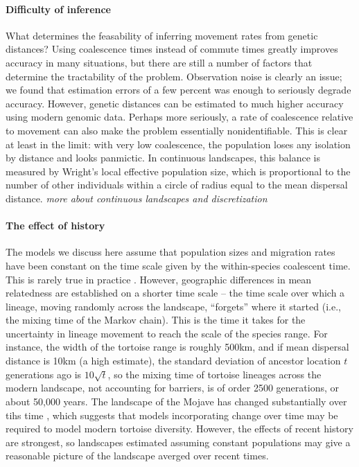 \documentclass{article}
\newcommand{\plr}[1]{{\em \color{blue} #1}}
\begin{document}
\paragraph{Difficulty of inference}
What determines the feasability of inferring movement rates from genetic distances?
Using coalescence times instead of commute times greatly improves accuracy in many situations,
but there are still a number of factors that determine the tractability of the problem.
Observation noise is clearly an issue;
we found that estimation errors of a few percent was enough to seriously degrade accuracy.
However, genetic distances can be estimated to much higher accuracy using modern genomic data.
Perhaps more seriously,
a rate of coalescence relative to movement can also make the problem essentially nonidentifiable.
This is clear at least in the limit: with very low coalescence, 
the population loses any isolation by distance and looks panmictic.
In continuous landscapes, this balance is measured by Wright's local effective population size,
which is proportional to the number of other individuals 
within a circle of radius equal to the mean dispersal distance.
\plr{more about continuous landscapes and discretization}

\paragraph{The effect of history}
The models we discuss here assume that population sizes and migration rates
have been constant on the time scale given by the within-species coalescent time.
This is rarely true in practice \citep{avise,barton}.
However, geographic differences in mean relatedness
are established on a shorter time scale --
the time scale over which a lineage, moving randomly across the landscape,
``forgets'' where it started
(i.e., the mixing time of the Markov chain).
This is the time it takes for the uncertainty in lineage movement
to reach the scale of the species range.
For instance,
the width of the tortoise range is roughly 500km,
and if mean dispersal distance is 10km (a high estimate),
the standard deviation of ancestor location $t$ generations ago is $10\sqrt{t}$,
so the mixing time of tortoise lineages across the modern landscape,
not accounting for barriers, is of order 2500 generations,
or about 50,000 years.
The landscape of the Mojave has changed substantially over tihs time \citep{pleistocene_mojave},
which suggests that models incorporating change over time 
may be required to model modern tortoise diversity.
However, the effects of recent history are strongest,
so landscapes estimated assuming constant populations
may give a reasonable picture of the landscape averged over recent times.
\end{document}
